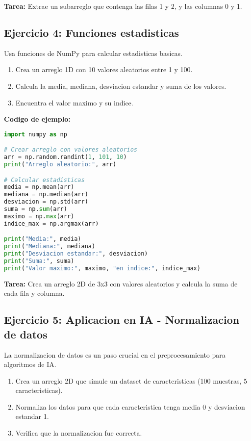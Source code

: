 \documentclass[a4paper,12pt]{article}
\begin{document}
\textbf{Tarea:} Extrae un subarreglo que contenga las filas 1 y 2, y las columnas 0 y 1.

\subsection{Ejercicio 4: Funciones estadisticas}
Usa funciones de NumPy para calcular estadisticas basicas.

\begin{enumerate}
    \item Crea un arreglo 1D con 10 valores aleatorios entre 1 y 100.
    \item Calcula la media, mediana, desviacion estandar y suma de los valores.
    \item Encuentra el valor maximo y su indice.
\end{enumerate}

\textbf{Codigo de ejemplo:}

\begin{lstlisting}[language=Python]
import numpy as np

# Crear arreglo con valores aleatorios
arr = np.random.randint(1, 101, 10)
print("Arreglo aleatorio:", arr)

# Calcular estadisticas
media = np.mean(arr)
mediana = np.median(arr)
desviacion = np.std(arr)
suma = np.sum(arr)
maximo = np.max(arr)
indice_max = np.argmax(arr)

print("Media:", media)
print("Mediana:", mediana)
print("Desviacion estandar:", desviacion)
print("Suma:", suma)
print("Valor maximo:", maximo, "en indice:", indice_max)
\end{lstlisting}

\textbf{Tarea:} Crea un arreglo 2D de 3x3 con valores aleatorios y calcula la suma de cada fila y columna.

\subsection{Ejercicio 5: Aplicacion en IA - Normalizacion de datos}
La normalizacion de datos es un paso crucial en el preprocesamiento para algoritmos de IA.

\begin{enumerate}
    \item Crea un arreglo 2D que simule un dataset de caracteristicas (100 muestras, 5 caracteristicas).
    \item Normaliza los datos para que cada caracteristica tenga media 0 y desviacion estandar 1.
    \item Verifica que la normalizacion fue correcta.
\end{enumerate}
\end{document}
